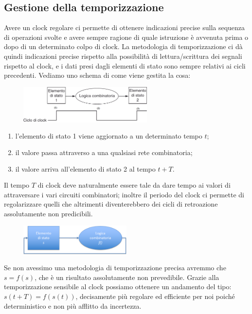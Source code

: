 \documentclass[class=book, crop=false, oneside]{standalone}
\begin{document}
\subsection{Gestione della temporizzazione}
Avere un clock regolare ci permette di ottenere indicazioni precise sulla sequenza di operazioni svolte e avere sempre ragione di quale istruzione è avvenuta prima o dopo di un determinato colpo di clock. La metodologia di temporizzazione ci dà quindi indicazioni precise rispetto alla possibilità di lettura/scrittura dei segnali rispetto al clock, e i dati presi dagli elementi di stato sono sempre relativi ai cicli precedenti. Vediamo uno schema di come viene gestita la cosa:
\begin{figure}[H]
	\centering
	\includegraphics[width=0.6\textwidth,keepaspectratio]{clock}
\end{figure}
\begin{enumerate}
	\item l'elemento di stato 1 viene aggiornato a un determinato tempo \(t\);
	\item il valore passa attraverso a una qualsiasi rete combinatoria;
	\item il valore arriva all'elemento di stato 2 al tempo \(t + T\).
\end{enumerate}
Il tempo \(T\) di clock deve naturalmente essere tale da dare tempo ai valori di attraversare i vari circuiti combinatori; inoltre il periodo del clock ci permette di regolarizzare quelli che altrimenti diventerebbero dei cicli di retroazione assolutamente non predicibili.
\begin{figure}[H]
	\centering
	\includegraphics[width=0.5\textwidth,keepaspectratio]{retroaz}
\end{figure}
Se non avessimo una metodologia di temporizzazione precisa avremmo che \(s = f(s)\), che è un risultato assolutamente non prevedibile. Grazie alla temporizzazione sensibile al clock possiamo ottenere un andamento del tipo: \(s(t + T) = f(s(t))\), decisamente più regolare ed efficiente per noi poiché deterministico e non più afflitto da incertezza.
\end{document}
